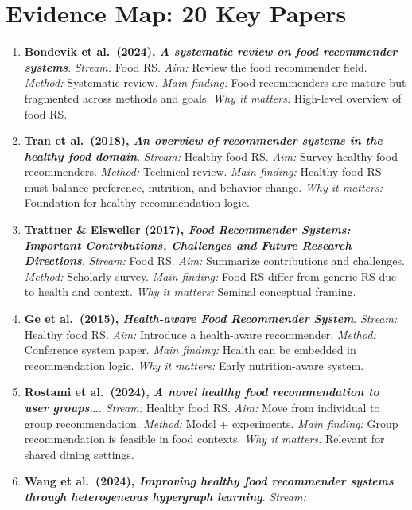 \section{Evidence Map: 20 Key Papers}\label{evidence-map-20-key-papers}

\begin{enumerate}
\def\labelenumi{\arabic{enumi}.}
\tightlist
\item
  \textbf{Bondevik et al.~(2024), \emph{A systematic review on food
  recommender systems}}. \emph{Stream:} Food RS. \emph{Aim:} Review the
  food recommender field. \emph{Method:} Systematic review. \emph{Main
  finding:} Food recommenders are mature but fragmented across methods
  and goals. \emph{Why it matters:} High-level overview of food RS.
\item
  \textbf{Tran et al.~(2018), \emph{An overview of recommender systems
  in the healthy food domain}}. \emph{Stream:} Healthy food RS.
  \emph{Aim:} Survey healthy-food recommenders. \emph{Method:} Technical
  review. \emph{Main finding:} Healthy-food RS must balance preference,
  nutrition, and behavior change. \emph{Why it matters:} Foundation for
  healthy recommendation logic.
\item
  \textbf{Trattner \& Elsweiler (2017), \emph{Food Recommender Systems:
  Important Contributions, Challenges and Future Research Directions}}.
  \emph{Stream:} Food RS. \emph{Aim:} Summarize contributions and
  challenges. \emph{Method:} Scholarly survey. \emph{Main finding:} Food
  RS differ from generic RS due to health and context. \emph{Why it
  matters:} Seminal conceptual framing.
\item
  \textbf{Ge et al.~(2015), \emph{Health-aware Food Recommender
  System}}. \emph{Stream:} Healthy food RS. \emph{Aim:} Introduce a
  health-aware recommender. \emph{Method:} Conference system paper.
  \emph{Main finding:} Health can be embedded in recommendation logic.
  \emph{Why it matters:} Early nutrition-aware system.
\item
  \textbf{Rostami et al.~(2024), \emph{A novel healthy food
  recommendation to user groups\ldots{}}}. \emph{Stream:} Healthy food
  RS. \emph{Aim:} Move from individual to group recommendation.
  \emph{Method:} Model + experiments. \emph{Main finding:} Group
  recommendation is feasible in food contexts. \emph{Why it matters:}
  Relevant for shared dining settings.
\item
  \textbf{Wang et al.~(2024), \emph{Improving healthy food recommender
  systems through heterogeneous hypergraph learning}}. \emph{Stream:}

\end{enumerate}
